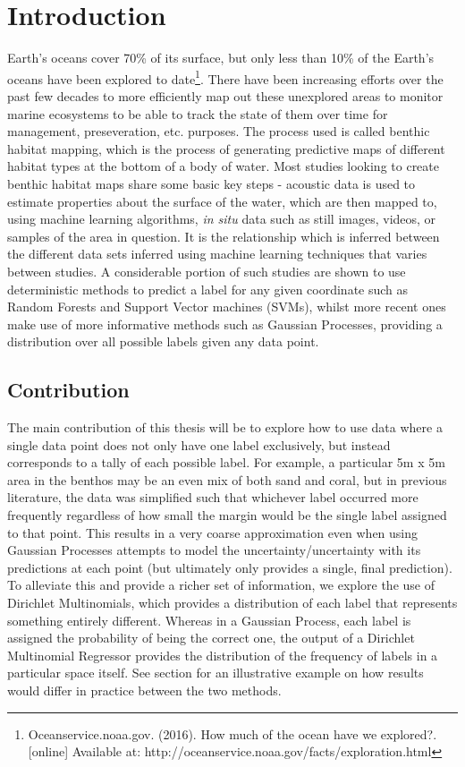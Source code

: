 \chapter{Introduction}

Earth's oceans cover 70\% of its surface, but only less than 10\% of the Earth's oceans have been explored to date\footnote{Oceanservice.noaa.gov. (2016). How much of the ocean have we explored?. [online] Available at: http://oceanservice.noaa.gov/facts/exploration.html}. There have been increasing efforts over the past few decades to more efficiently map out these unexplored areas to monitor marine ecosystems to be able to track the state of them over time for management, preseveration, etc. purposes. The process used is called benthic habitat mapping, which is the process of generating predictive maps of different habitat types at the bottom of a body of water. Most studies looking to create benthic habitat maps share some basic key steps - acoustic data is used to estimate properties about the surface of the water, which are then mapped to, using machine learning algorithms, \textit{in situ} data such as still images, videos, or samples of the area in question. It is the relationship which is inferred between the different data sets inferred using machine learning techniques that varies between studies. A considerable portion of such studies are shown to use deterministic methods to predict a label for any given coordinate such as Random Forests and Support Vector machines (SVMs), whilst more recent ones make use of more informative methods such as Gaussian Processes, providing a distribution over all possible labels given any data point.

\section{Contribution}

The main contribution of this thesis will be to explore how to use data where a single data point does not only have one label exclusively, but instead corresponds to a tally of each possible label. For example, a particular 5m x 5m area in the benthos may be an even mix of both sand and coral, but in previous literature, the data was simplified such that whichever label occurred more frequently regardless of how small the margin would be the single label assigned to that point. This results in a very coarse approximation even when using Gaussian Processes attempts to model the uncertainty/uncertainty with its predictions at each point (but ultimately only provides a single, final prediction). To alleviate this and provide a richer set of information, we explore the use of Dirichlet Multinomials, which provides a distribution of each label that represents something entirely different. Whereas in a Gaussian Process, each label is assigned the probability of being the correct one, the output of a Dirichlet Multinomial Regressor provides the distribution of the frequency of labels in a particular space itself. See section  for an illustrative example on how results would differ in practice between the two methods.

